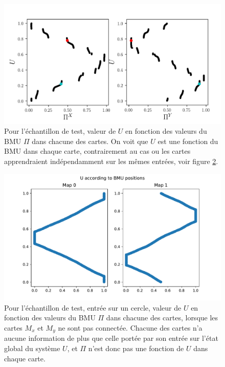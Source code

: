 \begin{figure}
\centering
\includegraphics[width = \textwidth]{XU_YU.pdf}
\caption{Pour l'échantillon de test, valeur de $U$ en fonction des valeurs du BMU $\Pi$ dans chacune des cartes. On voit que $U$ est une fonction du BMU dans chaque carte, contrairement au cas ou les cartes apprendraient indépendamment sur les mêmes entrées, voir figure \ref{fig:piu_indep}.}
\label{fig:piu}
\end{figure}

\begin{figure}
\centering
\includegraphics[width = \textwidth]{xu_yu_unco.pdf}
\caption{Pour l'échantillon de test, entrée sur un cercle, valeur de $U$ en fonction des valeurs du BMU $\Pi$ dans chacune des cartes, lorsque les cartes $M_x$ et $M_y$ ne sont pas connectée. Chacune des cartes n'a aucune information de plus que celle portée par son entrée sur l'état global du système $U$, et $\Pi$ n'est donc pas une fonction de $U$ dans chaque carte. }
\label{fig:piu_indep}
\end{figure}

